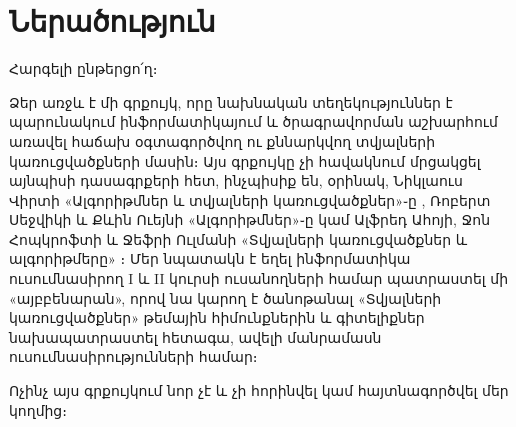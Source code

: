
%
%
%
\chapter{Ներածություն}

Հարգելի ընթերցո՛ղ։

Ձեր առջև է մի գրքույկ, որը նախնական տեղեկություններ է պարունակում
ինֆորմատիկայում և ծրագրավորման աշխարհում առավել հաճախ օգտագործվող ու
քննարկվող տվյալների կառուցվածքների մասին։ Այս գրքույկը չի հավակնում
մրցակցել այնպիսի դասագրքերի հետ, ինչպիսիք են, օրինակ, Նիկլաուս Վիրտի
«Ալգորիթմներ և տվյալների կառուցվածքներ»֊ը \cite{nw-ads}, Ռոբերտ Սեջվիկի
և Քևին Ուեյնի «Ալգորիթմներ»֊ը \cite{rs-kw-al} կամ Ալֆրեդ Ահոյի, Ջոն
Հոպկրոֆտի և Ջեֆրի Ուլմանի «Տվյալների կառուցվածքներ և ալգորիթմերը»
\cite{ahu-dsa}։ Մեր նպատակն է եղել ինֆորմատիկա ուսումնասիրող I և II
կուրսի ուսանողների համար պատրաստել մի «այբբենարան», որով նա կարող է
ծանոթանալ «Տվյալների կառուցվածքներ» թեմային հիմունքներին և գիտելիքներ
նախապատրաստել հետագա, ավելի մանրամասն ուսումնասիրությունների համար։ 

Ոչինչ այս գրքույկում նոր չէ և չի հորինվել կամ հայտնագործվել մեր կողմից։
